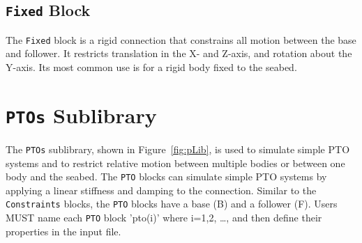         \subsection{\texttt{Fixed} Block}
        The \texttt{Fixed} block is a rigid connection that constrains all 
        motion between the base and follower. It restricts translation in the X- and Z-axis, 
        and rotation about the Y-axis.  Its most common use is for a rigid body  
        fixed to the seabed. 
	
    \section{\texttt{PTOs} Sublibrary}
	The \texttt{PTOs} sublibrary, shown in Figure~\ref{fig:pLib}, is used to 
	simulate simple PTO systems and to restrict relative motion between multiple 
	bodies or between one body and the seabed. The \texttt{PTO} blocks can simulate 
	simple PTO systems by applying a linear stiffness and damping to the connection. 
	Similar to the \texttt{Constraints} blocks, the \texttt{PTO} blocks have a base (B) 
	and a follower (F). Users MUST name each \texttt{PTO} block 'pto(i)' where i=1,2,
	\ldots, and then define their properties in the input file.
	
